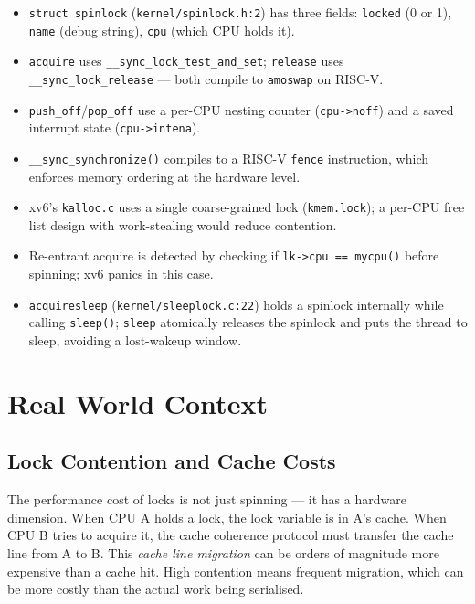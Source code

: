 \documentclass[11pt, a4paper]{article}
\begin{document}
\begin{tcolorbox}[impldetail]
\begin{itemize}[leftmargin=1.5em, itemsep=0.2em]
  \item \lstinline|struct spinlock| (\lstinline|kernel/spinlock.h:2|) has three fields: \lstinline|locked| (0 or 1), \lstinline|name| (debug string), \lstinline|cpu| (which CPU holds it).
  \item \lstinline|acquire| uses \lstinline|__sync_lock_test_and_set|; \lstinline|release| uses \lstinline|__sync_lock_release| --- both compile to \lstinline|amoswap| on RISC-V.
  \item \lstinline|push_off|/\lstinline|pop_off| use a per-CPU nesting counter (\lstinline|cpu->noff|) and a saved interrupt state (\lstinline|cpu->intena|).
  \item \lstinline|__sync_synchronize()| compiles to a RISC-V \lstinline|fence| instruction, which enforces memory ordering at the hardware level.
  \item xv6's \lstinline|kalloc.c| uses a single coarse-grained lock (\lstinline|kmem.lock|); a per-CPU free list design with work-stealing would reduce contention.
  \item Re-entrant acquire is detected by checking if \lstinline|lk->cpu == mycpu()| before spinning; xv6 panics in this case.
  \item \lstinline|acquiresleep| (\lstinline|kernel/sleeplock.c:22|) holds a spinlock internally while calling \lstinline|sleep()|; \lstinline|sleep| atomically releases the spinlock and puts the thread to sleep, avoiding a lost-wakeup window.
\end{itemize}
\end{tcolorbox}

\section{Real World Context}

\subsection{Lock Contention and Cache Costs}

The performance cost of locks is not just spinning --- it has a hardware dimension. When CPU A holds a lock, the lock variable is in A's cache. When CPU B tries to acquire it, the cache coherence protocol must transfer the cache line from A to B. This \emph{cache line migration} can be orders of magnitude more expensive than a cache hit. High contention means frequent migration, which can be more costly than the actual work being serialised.
\end{document}
